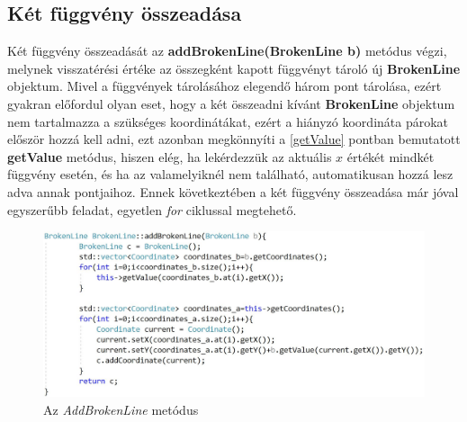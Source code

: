 \subsection{Két függvény összeadása} \label{addBrokenLine}
Két függvény összeadását az \textbf{addBrokenLine(BrokenLine b)} metódus végzi, melynek visszatérési értéke az összegként kapott függvényt tároló új \textbf{BrokenLine} objektum. Mivel a függvények tárolásához elegendő három pont tárolása, ezért gyakran előfordul olyan eset, hogy a két összeadni kívánt \textbf{BrokenLine} objektum nem tartalmazza a szükséges koordinátákat, ezért a hiányzó koordináta párokat először hozzá kell adni, ezt azonban megkönnyíti a \ref{getValue} pontban bemutatott \textbf{getValue} metódus, hiszen elég, ha lekérdezzük az aktuális $x$ értékét mindkét függvény esetén, és ha az valamelyiknél nem található, automatikusan hozzá lesz adva annak pontjaihoz. Ennek következtében a két függvény összeadása már jóval egyszerűbb feladat, egyetlen \textit{for} ciklussal megtehető.
\begin{figure}[H]
\begin{center}
\includegraphics[scale=0.375]{add_broken_line}
\caption{Az \textit{AddBrokenLine} metódus}
\label{add_broken_line}
\end{center}
\end{figure}
